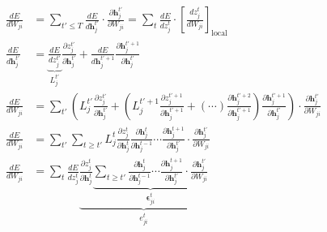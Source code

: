 \documentclass[t]{beamer}
\begin{document}
\begin{frame}{}
  \footnotesize
  \begin{align}
  \frac{dE}{dW_{ji}} &= \sum_{t' \leq T}\frac{dE}{d\mathbf{h}_j^{t'}}\cdot\frac{\partial \mathbf{h}_j^{t'}}{\partial W_{ji}} =
  \sum_t\frac{dE}{dz_j^t}\cdot\left[\frac{dz_j^t}{dW_{ji}}\right]_\text{local}\\
  \frac{dE}{d\mathbf{h}_j^{t'}} &= \underbrace{\frac{dE}{dz_j^{t'}}}_{L^{t'}_j} \frac{\partial z_j^{t'}}{\partial\mathbf{h}_j^{t'}} + \frac{dE}{d\mathbf{h}_j^{t'+1}}\frac{\partial\mathbf{h}_j^{t'+1}}{\partial\mathbf{h}_j^{t'}}\\
  \frac{dE}{dW_{ji}} &= \sum_{t'}\left(L_j^{t'}\frac{\partial z_j^{t'}}{\partial\mathbf{h}_j^{t'}} + \left( L^{t'+1}_j \frac{\partial z_j^{t'+1}}{\partial\mathbf{h}_j^{t'+1}} + (\cdots)\frac{\partial\mathbf{h}_j^{t'+2}}{\partial\mathbf{h}_j^{t'+1}}  \right) \frac{\partial\mathbf{h}_j^{t'+1}}{\partial\mathbf{h}_j^{t'}}\right)\cdot\frac{\partial\mathbf{h}_j^{t'}}{\partial W_{ji}}\\
  \frac{dE}{dW_{ji}} &= \sum_{t'}\sum_{t\geq t'}L^t_j\frac{\partial z_j^t}{\partial\mathbf{h}_j^t}\frac{\partial\mathbf{h}^t_j}{\partial\mathbf{h}_j^{t-1}} \cdots \frac{\partial\mathbf{h}_j^{t+1}}{\partial\mathbf{h}_j^{t'}}\cdot\frac{\partial\mathbf{h}_j^{t'}}{\partial W_{ji}}\\
  \frac{dE}{dW_{ji}} &= \sum_t\frac{dE}{dz_j^t}\underbrace{\frac{\partial z_j^t}{\partial\mathbf{h}_j^t}\underbrace{\sum_{t\geq t'}\frac{\partial\mathbf{h}^t_j}{\partial\mathbf{h}_j^{t-1}} \cdots \frac{\partial\mathbf{h}_j^{t+1}}{\partial\mathbf{h}_j^{t'}}\cdot\frac{\partial\mathbf{h}_j^{t'}}{\partial W_{ji}}}_{\bm{\epsilon}_{ji}^t}}_{e^t_{ji}}
  \end{align}
\end{frame}
\end{document}
